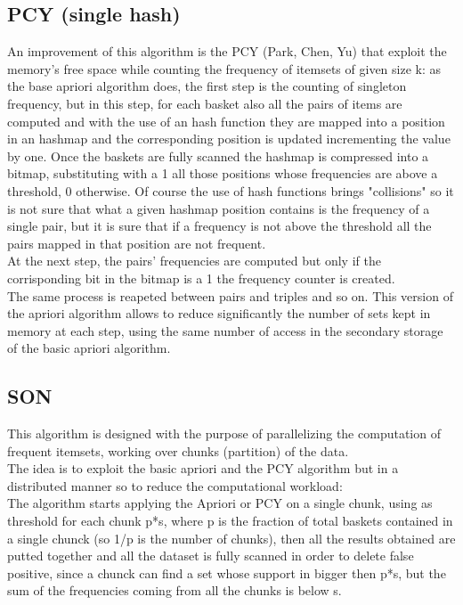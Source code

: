 \documentclass[14pt]{extarticle}
\begin{document}
\subsection{PCY (single hash)}
An improvement of this algorithm is the PCY (Park, Chen, Yu) that exploit the memory's free space while counting the frequency of itemsets of given size k:
as the base apriori algorithm does, the first step is the counting of singleton frequency, but in this step, for each basket also all the pairs of items are computed
and with the use of an hash function they are mapped into a position in an hashmap and the corresponding position is updated incrementing the value by one. Once the baskets are fully scanned the hashmap is compressed into a bitmap, substituting with a 1 all those positions whose frequencies are above a threshold, 0 otherwise.
Of course the use of hash functions brings "collisions" so it is not sure that what a given hashmap position contains is the frequency of a single pair, but it is sure that if a frequency is not above the threshold all the pairs mapped in that position are not frequent.\\
At the next step, the pairs' frequencies are computed but only if the corrisponding bit in the bitmap is a 1 the frequency counter is created.\\
The same process is reapeted between pairs and triples and so on.
This version of the apriori algorithm allows to reduce significantly the number of sets kept in memory at each step, using the same number of access in the secondary storage of the basic apriori algorithm.\\
 
\subsection{SON}
This algorithm is designed with the purpose of parallelizing the computation of frequent itemsets, working over chunks (partition) of the data.\\
The idea is to exploit the basic apriori and the PCY algorithm but in a distributed manner so to reduce the computational workload:\\
The algorithm starts applying the Apriori or PCY on a single chunk, using as threshold for each chunk p*s, where p is the fraction of total baskets contained in a single chunck (so 1/p is the number of chunks), then all the results obtained are putted together and all the dataset is fully scanned in order to delete false positive, since a chunck can find a set whose support in bigger then p*s, but the sum of the frequencies coming from all the chunks is below s.
\end{document}
